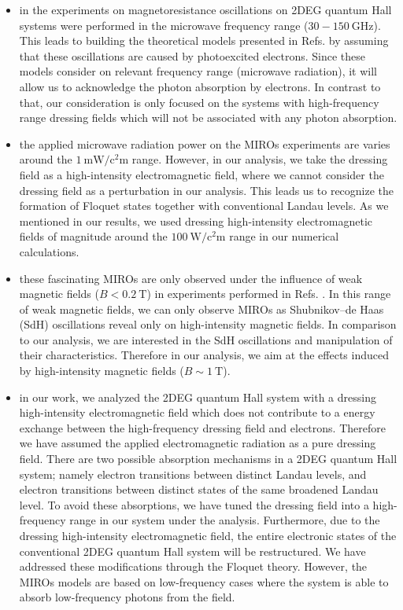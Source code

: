 \documentclass{article}
\begin{document}
\begin{itemize}
  \item
  in the experiments on magnetoresistance oscillations on 2DEG quantum Hall systems \cite{zudov01,mani02,zudov03,mani04} were performed in the microwave frequency range ($30 -\SI{150}{\giga\hertz}$). This leads to building the theoretical models presented in Refs. \cite{durst03,dmitriev03} by assuming that these oscillations are caused by photoexcited electrons. Since these models consider on relevant frequency range (microwave radiation), it will allow us to acknowledge the photon absorption by electrons. In contrast to that, our consideration is only focused on the systems with high-frequency range dressing fields which will not be associated with any photon absorption.
  \item
  the applied microwave radiation power on the MIROs experiments \cite{mani02,zudov03} are varies around the  $\SI{1}{\milli\watt\per\square\centi\metre}$ range. However, in our analysis, we take the dressing field as a high-intensity electromagnetic field, where we cannot consider the dressing field as a perturbation in our analysis. This leads us to recognize the formation of Floquet states together with conventional Landau levels. As we mentioned in our results, we used dressing high-intensity electromagnetic fields of magnitude around the $\SI{100}{\watt\per\square\centi\metre}$ range in our numerical calculations.
  \item
  these fascinating MIROs are only observed under the influence of weak magnetic fields ($B < \SI{0.2}{\tesla}$) in experiments performed in Refs. \cite{zudov01,mani02,zudov03,mani04}. In this range of weak magnetic fields,  we can only observe MIROs as Shubnikov–de Haas (SdH) oscillations reveal only on high-intensity magnetic fields. In comparison to our analysis, we are  interested in the SdH oscillations and manipulation of their characteristics. Therefore in our analysis, we aim at the effects induced by high-intensity magnetic fields ($B \sim \SI{1}{\tesla}$).
  \item
  in our work, we analyzed the 2DEG quantum Hall system with a dressing high-intensity electromagnetic field which does not contribute to a energy exchange between the high-frequency dressing field and electrons. Therefore we have assumed the applied electromagnetic radiation as a pure dressing field. There are two possible absorption mechanisms in a 2DEG quantum Hall system; namely electron transitions between distinct Landau levels, and electron transitions between distinct states of the same broadened Landau level. To avoid these absorptions, we have tuned the dressing field into a high-frequency range in our system under the analysis. Furthermore, due to the dressing high-intensity electromagnetic field, the entire electronic states of the conventional 2DEG quantum Hall system will be restructured. We have addressed these modifications through the Floquet theory. However, the MIROs models \cite{durst03,dmitriev03} are based on low-frequency cases where the system is able to absorb low-frequency photons from the field.
\end{itemize}
\end{document}
